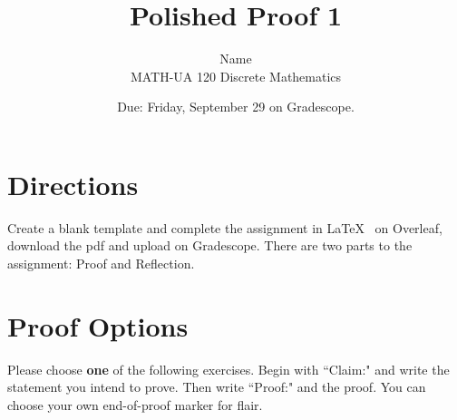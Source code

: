 \documentclass{article}
\title{Polished Proof 1}
\author{%
	Name
	\\
	MATH-UA 120 Discrete Mathematics
}
\date{Due: Friday, September 29 on Gradescope.}
\theoremstyle{definition}
\begin{document}
    \maketitle
	
\section*{Directions}
    Create a blank template and complete the assignment in \LaTeX~  on Overleaf, 
    download the pdf and upload on Gradescope. There are two parts to the assignment: Proof and Reflection.

\section*{Proof Options}
    Please choose \textbf{one} of the following exercises. Begin with ``Claim:" and write the statement you intend to prove. 
    Then write ``Proof:" and the proof. You can choose your own end-of-proof marker for flair.
\end{document}
